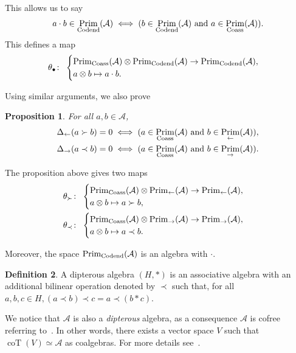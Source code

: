\documentclass[10pt,a4paper]{amsart}
\numberwithin{equation}{section}
\theoremstyle{definition}
\newtheorem{defi}{Definition}[section]
\theoremstyle{plain}
\newtheorem{Prop}[defi]{Proposition}
\DeclareMathOperator{\Prim}{Prim}
\DeclareMathOperator{\coT}{coT}
\begin{document}
This allows us to say
\[
a\cdot b\in \Prim_{\rm Codend}(\mathcal{A}) \iff (b\in\Prim_{\rm Codend}(\mathcal{A}) \  \text{and} \  a\in\Prim_{\rm Coass}(\mathcal{A})).
\]
This defines a map
\begin{equation*}
	\theta_{\bullet}\colon \ \begin{cases}
		\Prim_{\rm Coass}(\mathcal{A})\otimes \Prim_{\rm Codend}(\mathcal{A}) \rightarrow \Prim_{\rm Codend}(\mathcal{A}), \\
		a\otimes b \mapsto a\cdot b.
	\end{cases}
\end{equation*}

Using similar arguments, we also prove
\begin{Prop}
	For all $a,b\in \mathcal{A}$,
	\begin{gather*}
		\Delta_{\leftarrow}(a\succ b)=0\iff (a\in\Prim_{\rm Coass}(\mathcal{A}) \  \text{\rm and} \  b\in \Prim_{\leftarrow}(\mathcal{A})), \\
		\Delta_{\rightarrow}(a\prec b)=0\iff (a\in\Prim_{\rm Coass}(\mathcal{A}) \  \text{\rm and} \  b\in \Prim_{\rightarrow}(\mathcal{A})).
	\end{gather*}
\end{Prop}
 The proposition above gives two maps
\begin{align*}
	&\theta_{\succ}\colon \ \begin{cases}
		\Prim_{\rm Coass}(\mathcal{A})\otimes \Prim_{\leftarrow}(\mathcal{A}) \rightarrow \Prim_{\leftarrow}(\mathcal{A}),\\
		a\otimes b \mapsto a\succ b,
	\end{cases} \\
&\theta_{\prec}\colon \ \begin{cases}
	\Prim_{\rm Coass}(\mathcal{A})\otimes \Prim_{\rightarrow}(\mathcal{A}) \rightarrow \Prim_{\rightarrow}(\mathcal{A}), \\
	a\otimes b \mapsto a\prec b.
\end{cases}
\end{align*}

Moreover, the space $\Prim_{\rm Codend}(\mathcal{A})$ is an algebra with $\cdot$.

\begin{defi}
	A dipterous algebra $(H,*)$ is an associative algebra with an additional bilinear operation denoted by $\prec$ such that, for all $a,b,c\in H, (a\prec b)\prec c= a\prec (b*c)$.
\end{defi} We notice that $\mathcal{A}$ is also a \emph{dipterous} algebra, as a consequence $\mathcal{A}$ is cofree referring to~\cite{diptere}. In other words, there exists a vector space $V$ such that $\coT(V)\simeq \mathcal{A}$ as coalgebras. For more details see~\cite{diptere}.
\end{document}
